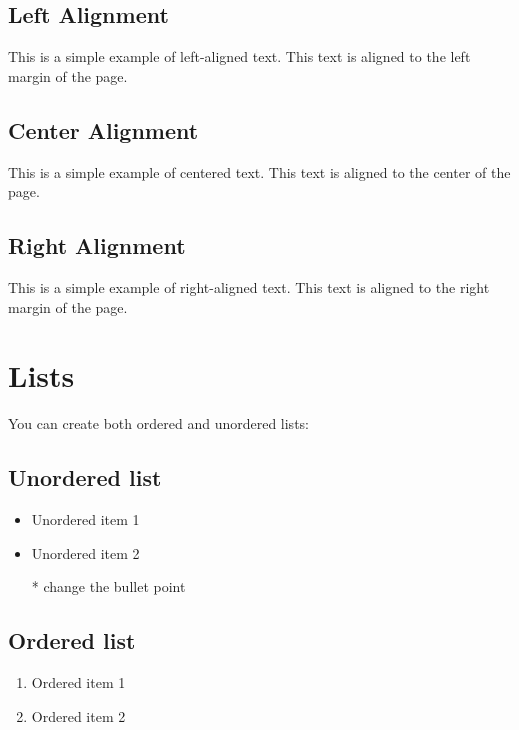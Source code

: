 \documentclass{article}
\begin{document}
\subsection{Left Alignment}

\begin{flushleft} This is a simple example of left-aligned text. This text is aligned to the left margin of the page.
\end{flushleft}

\subsection{Center Alignment}
\begin{center}
This is a simple example of centered text. This text is aligned to the center of the page.
\end{center}

\subsection{Right Alignment}
\begin{flushright} This is a simple example of right-aligned text. This text is aligned to the right margin of the page.
\end{flushright}


\section{Lists}
You can create both ordered and unordered lists:

\subsection{Unordered list}
 \begin{itemize}
     \item Unordered item 1
     \item Unordered item 2
     \item[*] change the bullet point  
 \end{itemize}
 
\subsection{Ordered list}
\begin{enumerate}
    \item Ordered item 1
    \item Ordered item 2
\end{enumerate}
\end{document}

